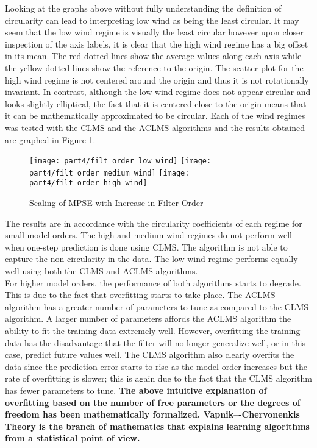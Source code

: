 \noindent{}Looking at the graphs above without fully understanding the definition of circularity can lead to interpreting low wind as being the least circular. It may seem that the low wind regime is visually the least circular however upon closer inspection of the axis labels, it is clear that the high wind regime has a big offset in its mean. The red dotted lines show the average values along each axis while the yellow dotted lines show the reference to the origin. The scatter plot for the high wind regime is not centered around the origin and thus it is not rotationally invariant. In contrast, although the low wind regime does not appear circular and looks slightly elliptical, the fact that it is centered close to the origin means that it can be mathematically approximated to be circular. Each of the wind regimes was tested with the CLMS and the ACLMS algorithms and the results obtained are graphed in Figure \ref{fig:wind_order}.

\begin{figure}[H]
\centering{}
\texttt{[image: part4/filt\_order\_low\_wind]}
\texttt{[image: part4/filt\_order\_medium\_wind]}
\texttt{[image: part4/filt\_order\_high\_wind]}
\caption{Scaling of MPSE with Increase in Filter Order}
\label{fig:wind_order}
\end{figure}

\noindent{}The results are in accordance with the circularity coefficients of each regime for small model orders. The high and medium wind regimes do not perform well when one-step prediction is done using CLMS. The algorithm is not able to capture the non-circularity in the data. The low wind regime performs equally well using both the CLMS and ACLMS algorithms.\\

\noindent{}For higher model orders, the performance of both algorithms starts to degrade. This is due to the fact that overfitting starts to take place. The ACLMS algorithm has a greater number of parameters to tune as compared to the CLMS algorithm. A larger number of parameters affords the ACLMS algorithm the ability to fit the training data extremely well. However, overfitting the training data has the disadvantage that the filter will no longer generalize well, or in this case, predict future values well. The CLMS algorithm also clearly overfits the data since the prediction error starts to rise as the model order increases but the rate of overfitting is slower; this is again due to the fact that the CLMS algorithm has fewer parameters to tune. \textbf{The above intuitive explanation of overfitting based on the number of free parameters or the degrees of freedom has been mathematically formalized. Vapnik–-Chervonenkis Theory is the branch of mathematics that explains learning algorithms from a statistical point of view.} \\

